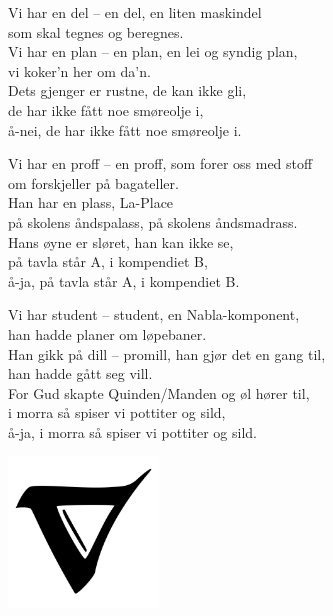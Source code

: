 \documentclass{article}
\begin{document}
\begin{landscape}
\begin{multicols}{3}
\begin{center}
\columnbreak
Vi har en del -- en del, en liten maskindel\\
som skal tegnes og beregnes.\\
Vi har en plan -- en plan, en lei og syndig plan,\\
vi koker'n her om da'n.\\
Dets gjenger er rustne, de kan ikke gli,\\
de har ikke fått noe smøreolje i,\\
å-nei, de har ikke fått noe smøreolje i.\\

\medskip

Vi har en proff -- en proff, som forer oss med stoff\\
om forskjeller på bagateller.\\
Han har en plass, La-Place\\
på skolens åndspalass, på skolens åndsmadrass.\\
Hans øyne er sløret, han kan ikke se,\\
på tavla står A, i kompendiet B,\\
å-ja, på tavla står A, i kompendiet B.\\

\medskip

Vi har student -- student, en Nabla-komponent,\\
han hadde planer om løpebaner.\\
Han gikk på dill -- promill, han gjør det en gang til,\\
han hadde gått seg vill.\\
For Gud skapte Quinden/Manden og øl hører til,\\
i morra så spiser vi pottiter og sild,\\
å-ja, i morra så spiser vi pottiter og sild.\\


\columnbreak

\vspace*{\fill}

\begin{center}
\includegraphics[width=0.3\textwidth]{bilder/nabla.jpg}
\end{center}


\end{center}
\end{multicols}
\end{landscape}
\end{document}
